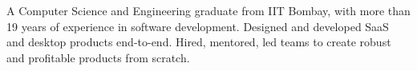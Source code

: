 

\begin{cvparagraph}

A Computer Science and Engineering graduate from IIT Bombay, with more than 19 years of experience in software development. Designed and developed SaaS and desktop products end-to-end. Hired, mentored, led teams to create robust and profitable products from scratch.
\end{cvparagraph}
